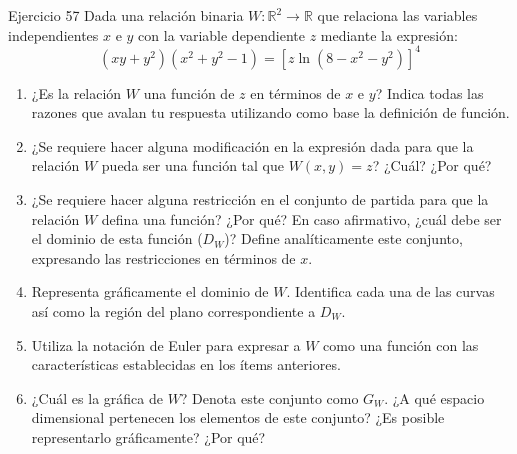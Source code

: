 \documentclass[aspectratio=169, 10pt]{beamer}
\begin{document}
\begin{frame}{Ejercicio 57}
  \small
  Dada una relación binaria $W : \mathbb{R}^2 \longrightarrow \mathbb{R}$ que relaciona las variables independientes $x$ e $y$ con la variable dependiente $z$ mediante la expresión:
  \[
    (xy + y^2)(x^2 + y^2 - 1) = \left[z \ln(8 - x^2 - y^2)\right]^4
  \]
  \begin{enumerate}
    \item[(A)] ¿Es la relación $W$ una función de $z$ en términos de $x$ e $y$? Indica todas las razones que avalan tu respuesta utilizando como base la definición de función.
    \item[(B)] ¿Se requiere hacer alguna modificación en la expresión dada para que la relación $W$ pueda ser una función tal que $W(x,y) = z$? ¿Cuál? ¿Por qué?
    \item[(C)] ¿Se requiere hacer alguna restricción en el conjunto de partida para que la relación $W$ defina una función? ¿Por qué? En caso afirmativo, ¿cuál debe ser el dominio de esta función ($D_W$)? Define analíticamente este conjunto, expresando las restricciones en términos de $x$.
    \item[(D)] Representa gráficamente el dominio de $W$. Identifica cada una de las curvas así como la región del plano correspondiente a $D_W$.
    \item[(E)] Utiliza la notación de Euler para expresar a $W$ como una función con las características establecidas en los ítems anteriores.
    \item[(F)] ¿Cuál es la gráfica de $W$? Denota este conjunto como $G_W$. ¿A qué espacio dimensional pertenecen los elementos de este conjunto? ¿Es posible representarlo gráficamente? ¿Por qué?
  \end{enumerate}
  \vfill
\end{frame}
\end{document}

